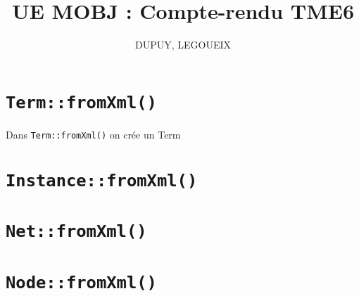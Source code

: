 \documentclass{article}
\author{DUPUY, LEGOUEIX}
\title{UE MOBJ : Compte-rendu TME6}
\begin{document}
\maketitle

\section{\texttt{Term::fromXml()}}

Dans \texttt{Term::fromXml()} on crée un Term 

\section{\texttt{Instance::fromXml()}}

\section{\texttt{Net::fromXml()}}

\section{\texttt{Node::fromXml()}}
\end{document}
